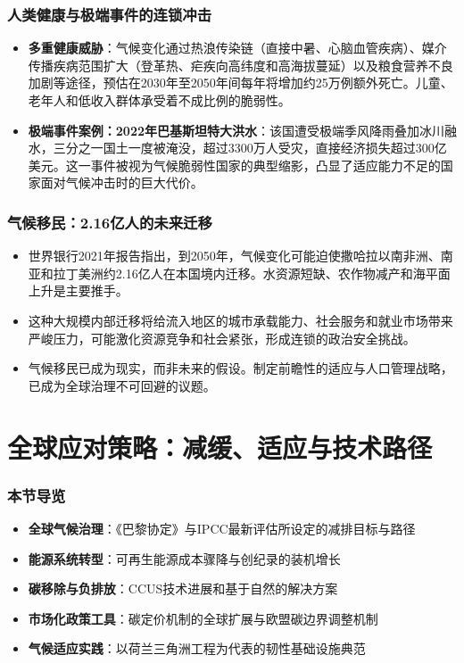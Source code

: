 \documentclass[11pt]{beamer}
\begin{document}
\begin{frame}
\frametitle{人类健康与极端事件的连锁冲击}
\begin{itemize}
\item \textbf{多重健康威胁}：气候变化通过\alert{热浪传染链}（直接中暑、心脑血管疾病）、\alert{媒介传播疾病范围扩大}（登革热、疟疾向高纬度和高海拔蔓延）以及\alert{粮食营养不良加剧}等途径，预估在\alert{2030年至2050年间}每年将增加约\alert{25万例额外死亡}。儿童、老年人和低收入群体承受着不成比例的脆弱性。
\item \textbf{极端事件案例：2022年巴基斯坦特大洪水}：该国遭受极端季风降雨叠加冰川融水，三分之一国土一度被淹没，超过\alert{3300万人}受灾，直接经济损失超过\alert{300亿美元}。这一事件被视为气候脆弱性国家的典型缩影，凸显了适应能力不足的国家面对气候冲击时的巨大代价。
\end{itemize}
\end{frame}

\begin{frame}
\frametitle{气候移民：2.16亿人的未来迁移}
\begin{itemize}
\item 世界银行2021年报告指出，到\alert{2050年}，气候变化可能迫使撒哈拉以南非洲、南亚和拉丁美洲约\alert{2.16亿人}在本国境内迁移。水资源短缺、农作物减产和海平面上升是主要推手。
\item 这种大规模内部迁移将给流入地区的城市承载能力、社会服务和就业市场带来严峻压力，可能激化资源竞争和社会紧张，形成连锁的政治安全挑战。
\item 气候移民已成为现实，而非未来的假设。制定前瞻性的适应与人口管理战略，已成为全球治理不可回避的议题。
\end{itemize}
\end{frame}

\section{全球应对策略：减缓、适应与技术路径}

\begin{frame}[fragile]\frametitle{本节导览}
\small
\begin{itemize}
    \item \textbf{全球气候治理}：《巴黎协定》与IPCC最新评估所设定的减排目标与路径
    \item \textbf{能源系统转型}：可再生能源成本骤降与创纪录的装机增长
    \item \textbf{碳移除与负排放}：CCUS技术进展和基于自然的解决方案
    \item \textbf{市场化政策工具}：碳定价机制的全球扩展与欧盟碳边界调整机制
    \item \textbf{气候适应实践}：以荷兰三角洲工程为代表的韧性基础设施典范
\end{itemize}
\end{frame}
\end{document}
